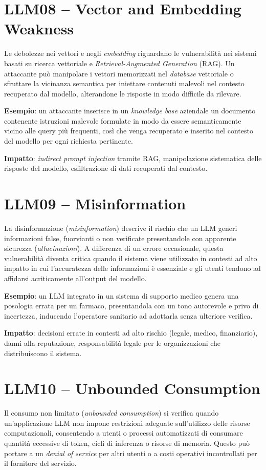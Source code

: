\section*{LLM08 -- Vector and Embedding Weakness}
Le debolezze nei vettori e negli \emph{embedding} riguardano le vulnerabilità nei sistemi basati su ricerca vettoriale e \emph{Retrieval-Augmented Generation} (RAG). Un attaccante può manipolare i vettori memorizzati nel \emph{database} vettoriale o sfruttare la vicinanza semantica per iniettare contenuti malevoli nel contesto recuperato dal modello, alterandone le risposte in modo difficile da rilevare.

\textbf{Esempio}: un attaccante inserisce in un \emph{knowledge base} aziendale un documento contenente istruzioni malevole formulate in modo da essere semanticamente vicino alle query più frequenti, così che venga recuperato e inserito nel contesto del modello per ogni richiesta pertinente.

\textbf{Impatto}: \emph{indirect prompt injection} tramite RAG, manipolazione sistematica delle risposte del modello, esfiltrazione di dati recuperati dal contesto.

\section*{LLM09 -- Misinformation}
La disinformazione (\emph{misinformation}) descrive il rischio che un LLM generi informazioni false, fuorvianti o non verificate presentandole con apparente sicurezza (\emph{allucinazioni}). A differenza di un errore occasionale, questa vulnerabilità diventa critica quando il sistema viene utilizzato in contesti ad alto impatto in cui l'accuratezza delle informazioni è essenziale e gli utenti tendono ad affidarsi acriticamente all'output del modello.

\textbf{Esempio}: un LLM integrato in un sistema di supporto medico genera una posologia errata per un farmaco, presentandola con un tono autorevole e privo di incertezza, inducendo l'operatore sanitario ad adottarla senza ulteriore verifica.

\textbf{Impatto}: decisioni errate in contesti ad alto rischio (legale, medico, finanziario), danni alla reputazione, responsabilità legale per le organizzazioni che distribuiscono il sistema.

\section*{LLM10 -- Unbounded Consumption}
Il consumo non limitato (\emph{unbounded consumption}) si verifica quando un'applicazione LLM non impone restrizioni adeguate sull'utilizzo delle risorse computazionali, consentendo a utenti o processi automatizzati di consumare quantità eccessive di token, cicli di inferenza o risorse di memoria. Questo può portare a un \emph{denial of service} per altri utenti o a costi operativi incontrollati per il fornitore del servizio.

